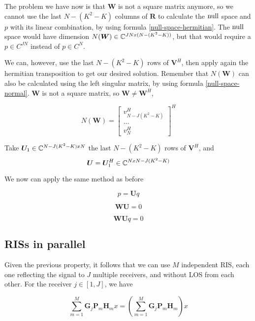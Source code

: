 The problem we have now is that $\bm{W}$ is not a square matrix anymore, so we cannot use the last $N - (K^2 - K)$ columns of $\bm{R}$ to calculate the $\operatorname{null}$ space and $p$ with its linear combination, by using formula \eqref{null-space-hermitian}. The $\operatorname{null}$ space would have dimension $N(\bm{W}) \in \mathbb{C}^{JN x (N - (K^2 - K))}$, but that would require a $p \in C^{JN}$ instead of $p \in C^{N}$.

We can, however, use the last $N - (K^2 - K)$ rows of $\bm{V}^H$, then apply again the hermitian transposition to get our desired solution. Remember that $N(\bm{W})$ can also be calculated using the left singular matrix, by using formula \eqref{null-space-normal}. $\bm{W}$ is not a square matrix, so $\bm{W} \ne \bm{W}^H$,

\begin{equation}
  N(\bm{W}) = \begin{bmatrix} v^H_{N - J(K^2 - K)} \\ ... \\ v^H_N \end{bmatrix} ^ H
\end{equation}

Take $\bm{U}_1 \in \mathbb{C} ^ {N - J(K^2 - K) x N}$ the last $N - (K^2 - K)$ rows of $\bm{V}^H$, and
\begin{equation}
  \bm{U} = \bm{U}_1^H \in \mathbb{C} ^ {N x N - J(K^2 - K)}
\end{equation}

We now can apply the same method as before

\begin{equation}p = \bm{U}q\end{equation}

\begin{equation}\bm{WU} = 0\end{equation}

\begin{equation}\bm{WU}q = 0\end{equation}

\subsection{RISs in parallel}

Given the previous property, it follows that we can use $M$ independent RIS, each one reflecting the signal to $J$ multiple receivers, and without LOS from each other. For the receiver $j \in [1, J]$, we have

\begin{equation}
  \sum_{m=1}^M \bm{G}_j \bm{P}_m \bm{H}_m x = (\sum_{m=1}^M \bm{G}_j \bm{P}_m \bm{H}_m) x
\end{equation}

